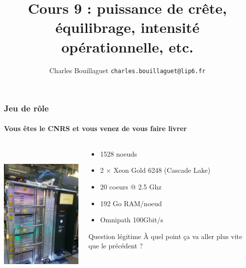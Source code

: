 \documentclass[xcolor={x11names,svgnames}]{beamer}
\author[C.~Bouillaguet]{Charles Bouillaguet \newline
  {\small \texttt{charles.bouillaguet@lip6.fr}}}
\title{Cours 9 : puissance de crête, équilibrage, intensité opérationnelle, etc.}
\begin{document}
\begin{frame}[label=title]
    \titlepage
  \end{frame}
  

\begin{frame}
  \frametitle{Jeu de rôle}
  \framesubtitle{Vous êtes le CNRS et vous venez de vous faire livrer}
  \centering
  \begin{columns}
    \begin{column}{4.75cm}
      \includegraphics[height=7cm]{jean-zay}
    \end{column}
    \begin{column}{5.5cm}
      \small
      \begin{itemize}
      \item 1528 noeuds
      \item 2 $\times$ Xeon Gold 6248 (\og Cascade Lake\fg{})
      \item 20 coeurs @ 2.5 Ghz
      \item 192 Go RAM/noeud
      \item Omnipath 100Gbit/s
      \end{itemize}

      \begin{block}{Question légitime}
        À quel point ça va aller plus vite que le précédent ?
      \end{block}
    \end{column}
  \end{columns}
\end{frame}

\end{document}
